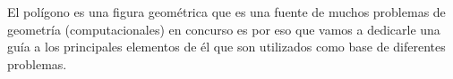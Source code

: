 El polígono es una figura geométrica que es una fuente de muchos problemas de geometría (computacionales) en concurso es por eso que vamos a dedicarle una guía a los principales elementos de él que son utilizados como base de diferentes problemas.
